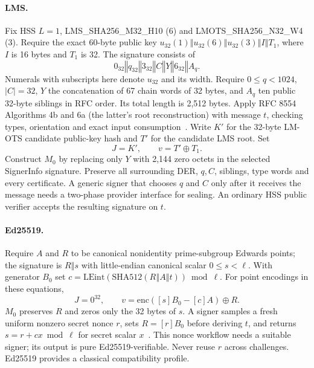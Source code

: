 \documentclass[10pt,twocolumn,letterpaper]{article}
\newcommand{\cat}{\mathbin\Vert}
\newcommand{\bx}{\mathbin\oplus}
\begin{document}
\paragraph{LMS.}
Fix HSS $L=1$, LMS\_SHA256\_M32\_H10 (6) and LMOTS\_SHA256\_N32\_W4 (3). Require the exact 60-byte public key $u_{32}(1)\cat u_{32}(6)\cat u_{32}(3)\cat I\cat T_1$, where $I$ is 16 bytes and $T_1$ is 32. The signature consists of
\[
 0_{32}\cat q_{32}\cat 3_{32}\cat C\cat Y\cat 6_{32}\cat A_q .
\]
Numerals with subscripts here denote $u_{32}$ and its width. Require $0\le q<1024$, $|C|=32$, $Y$ the concatenation of 67 chain words of 32 bytes, and $A_q$ ten public 32-byte siblings in RFC order. Its total length is 2,512 bytes. Apply RFC 8554 Algorithms 4b and 6a (the latter's root reconstruction) with message $t$, checking types, orientation and exact input consumption~\cite{lms}. Write $K'$ for the 32-byte LM-OTS candidate public-key hash and $T'$ for the candidate LMS root. Set
\[
 J=K', \qquad v=T'\bx T_1 .
\]
Construct $M_0$ by replacing only $Y$ with 2,144 zero octets in the selected SignerInfo signature. Preserve all surrounding DER, $q,C$, siblings, type words and every certificate. A generic signer that chooses $q$ and $C$ only after it receives the message needs a two-phase provider interface for sealing. An ordinary HSS public verifier accepts the resulting signature on $t$.

\paragraph{Ed25519.}
Require $A$ and $R$ to be canonical nonidentity prime-subgroup Edwards points; the signature is $R\cat s$ with little-endian canonical scalar $0\le s<\ell$. With generator $B_0$ set $c=\mathrm{LEint}(\mathrm{SHA512}(R\cat A\cat t))\bmod\ell$. For point encodings in these equations,
\[
 J=0^{32},\qquad
 v=\mathrm{enc}([s]B_0-[c]A)\bx R .
\]
$M_0$ preserves $R$ and zeros only the 32 bytes of $s$. A signer samples a fresh uniform nonzero secret nonce $r$, sets $R=[r]B_0$ before deriving $t$, and returns $s=r+cx\bmod\ell$ for secret scalar $x$~\cite{ed,previous}. This nonce workflow needs a suitable signer; its output is pure Ed25519-verifiable. Never reuse $r$ across challenges. Ed25519 provides a classical compatibility profile.
\end{document}
